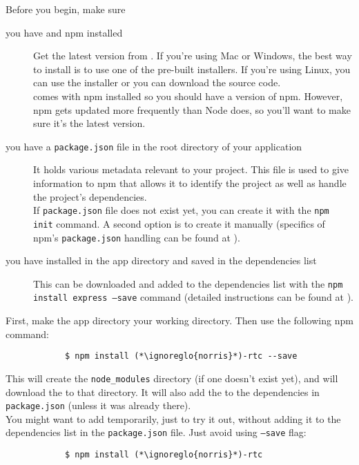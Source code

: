 		Before you begin, make sure
		\begin{description}
			\item[you have  and npm installed] Get the latest version from . If you're using Mac or Windows, the best way to install  is to use one of the pre-built installers. If you're using Linux, you can use the installer or you can download the source code.\\
			 comes with npm installed so you should have a version of npm. However, npm gets updated more frequently than Node does, so you'll want to make sure it's the latest version.
			\item[you have a \texttt{package.json} file in the root directory of your application] It holds various metadata relevant to your project. This file is used to give information to npm that allows it to identify the project as well as handle the project's dependencies.\\
			If \texttt{package.json} file does not exist yet, you can create it with the \texttt{npm init} command. A second option is to create it manually (specifics of npm's \texttt{package.json} handling can be found at ).
			\item[you have  installed in the app directory and saved in the dependencies list] This  can be downloaded and added to the dependencies list with the \texttt{npm install express --save} command (detailed instructions can be found at ).
		\end{description}
		First, make the app directory your working directory. Then use the following npm command:
		\begin{lstlisting}
			$ npm install (*\ignoreglo{norris}*)-rtc --save
		\end{lstlisting}
		This will create the \texttt{node\_modules} directory (if one doesn't exist yet), and will download the  to that directory. It will also add the  to the dependencies in \texttt{package.json} (unless it was already there).\\
		You might want to add  temporarily, just to try it out, without adding it to the dependencies list in the \texttt{package.json} file. Just avoid using \texttt{--save} flag:
		\begin{lstlisting}
			$ npm install (*\ignoreglo{norris}*)-rtc
		\end{lstlisting}